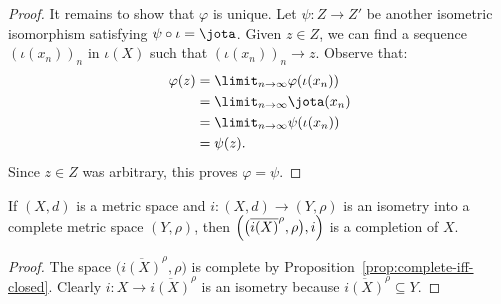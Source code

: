 \begin{theorem}
\begin{proof}
                It remains to show that $\varphi$ is unique. Let $\psi:Z \rightarrow Z'$ be another isometric isomorphism satisfying $\psi \circ \iota = \jota$. Given $z \in Z$, we can find a sequence $(\iota(x_n))_n$ in $\iota(X)$ such that $(\iota(x_n))_n \rightarrow z$. Observe that:
                    \begin{equation*}
                    \begin{split}
                        \varphi(z)
                        & = \limit_{n \rightarrow \infty} \varphi(\iota(x_n)) \\
                        & = \limit_{n \rightarrow \infty} \jota(x_n) \\
                        & = \limit_{n \rightarrow \infty} \psi(\iota(x_n)) \\
                        & = \psi(z).
                    \end{split}
                    \end{equation*}
                Since $z \in Z$ was arbitrary, this proves $\varphi = \psi$. 
            \end{proof}
    \end{theorem}

    \begin{lemma}
        If $(X,d)$ is a metric space and $i:(X,d) \rightarrow (Y,\rho)$ is an isometry into a complete metric space $(Y,\rho)$, then $\Bigl( \bigl(\overline{i(X)}^\rho , \rho\bigr), i\Bigr)$ is a completion of $X$.
    \end{lemma}
        \begin{proof}
            The space $\bigl(\overline{i(X)}^\rho,\rho\bigr)$ is complete by Proposition~\ref{prop:complete-iff-closed}. Clearly $i:X \rightarrow \overline{i(X)}^\rho$ is an isometry because $\overline{i(X)}^\rho \subseteq Y$.
        \end{proof}

